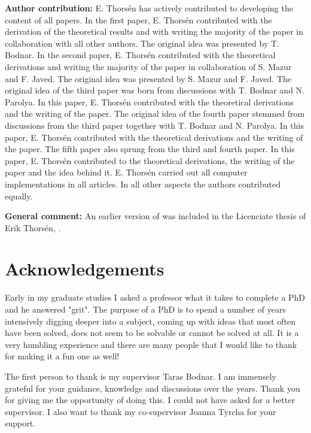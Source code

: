 \documentclass[12pt, oneside]{book}\usepackage{knitr}
\begin{document}
{\printbibliography[keyword={included_in_thesis}, title={Papers included in this thesis}, heading=subbibliography]
\printbibliography[keyword={papers_list}, title={Papers \& other research results which are not included in this thesis},
heading=subbibliography]

\textbf{Author contribution:} 
E. Thors\'en has actively contributed to developing the content of all papers.
In the first paper, E. Thors\'en contributed with the derivation of the theoretical results and with writing the majority of the paper in collaboration with all other authors. The original idea was presented by T. Bodnar.
In the second paper, E. Thors\'en contributed with the theoretical derivations and writing the majority of the paper in collaboration of S. Mazur and F. Javed. The original idea was presented by S. Mazur and F. Javed.
The original idea of the third paper was born from discussions with T. Bodnar and N. Parolya. 
In this paper, E. Thors\'en contributed with the theoretical derivations and the writing of the paper.
The original idea of the fourth paper stemmed from discussions from the third paper together with T. Bodnar and N. Parolya.
In this paper, E. Thors\'en contributed with the theoretical derivations and the writing of the paper.
The fifth paper also sprung from the third and fourth paper. 
In this paper, E. Thors\'en contributed to the theoretical derivations, the writing of the paper and the idea behind it.
E. Thorsén carried out all computer implementations in all articles.
In all other aspects the authors contributed equally.

\textbf{General comment:} An earlier version of \citet{bodnar2020sampling} was included in the Licenciate thesis of Erik Thors\'en, \citet{thorsen2019assessment}. 

\chapter*{Acknowledgements}

Early in my graduate studies I asked a professor what it takes to complete a PhD and he answered "grit".
The purpose of a PhD is to spend a number of years intensively digging deeper into a subject, coming up with ideas that most often have been solved, does not seem to be solvable or cannot be solved at all.
It is a very humbling experience and there are many people that I would like to thank for making it a fun one as well!

The first person to thank is my supervisor Taras Bodnar.
I am immensely grateful for your guidance, knowledge and discussions over the years.
Thank you for giving me the opportunity of doing this.
I could not have asked for a better supervisor.
I also want to thank my co-supervisor Joanna Tyrcha for your support.

}
\end{document}
